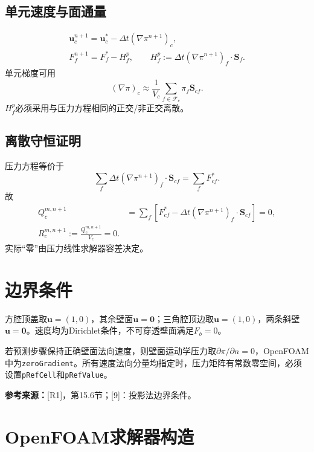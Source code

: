 \documentclass[UTF8,12pt,a4paper]{ctexart}
\numberwithin{equation}{section}
\newcommand{\dt}{\Delta t}
\newcommand{\Guermond}{\textnormal{[9]}}
\newcommand{\Rone}{\textnormal{[R1]}}
\newcommand{\source}[1]{\par\smallskip\noindent\colorbox{sourcebg}{%
  \parbox{0.955\linewidth}{\footnotesize\color{sourcegray}\textbf{参考来源：}#1}}\par\smallskip}
\begin{document}
\subsection{单元速度与面通量}
\begin{align}
  \boxed{\bm u_c^{n+1}
  =\bm u_c^*-\dt(\nabla\pi^{n+1})_c,}
  \label{eq:cell_velocity_correction}\\
  \boxed{F_f^{n+1}=F_f^*-H_f^p,\qquad
  H_f^p:=\dt(\nabla\pi^{n+1})_f\cdot\bm S_f.}
  \label{eq:final_phi}
\end{align}
单元梯度可用
\begin{equation}
  (\nabla\pi)_c\approx \frac{1}{V_c}
  \sum_{f\in\mathcal F_c}\pi_f\bm S_{cf}.
\end{equation}
$H_f^p$必须采用与压力方程相同的正交/非正交离散。

\subsection{离散守恒证明}
压力方程等价于
\[
  \sum_f\dt(\nabla\pi^{n+1})_f\cdot\bm S_{cf}
  =\sum_fF_{cf}^*.
\]
故
\begin{align}
  Q_c^{m,n+1}
  &=\sum_f\left[F_{cf}^*
  -\dt(\nabla\pi^{n+1})_f\cdot\bm S_{cf}\right]=0,\\
  \boxed{R_c^{m,n+1}:=\frac{Q_c^{m,n+1}}{V_c}=0.}
  \label{eq:discrete_zero_div}
\end{align}
实际“零”由压力线性求解器容差决定。

\section{边界条件}
方腔顶盖取$\bm u=(1,0)$，其余壁面$\bm u=\bm0$；三角腔顶边取$\bm u=(1,0)$，两条斜壁$\bm u=\bm0$。速度均为Dirichlet条件，不可穿透壁面满足$F_b=0$。

若预测步骤保持正确壁面法向速度，则壁面运动学压力取$\partial\pi/\partial n=0$，OpenFOAM中为\texttt{zeroGradient}。所有速度法向分量均指定时，压力矩阵有常数零空间，必须设置\texttt{pRefCell}和\texttt{pRefValue}。
\source{\Rone，第15.6节；\Guermond：投影法边界条件。}

\section{OpenFOAM求解器构造}
\end{document}
